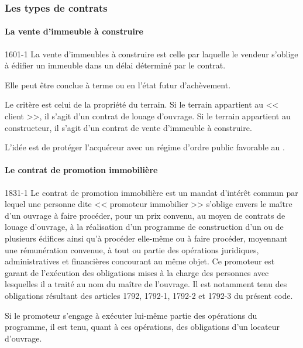 			\subsubsection{Les types de contrats}

				\paragraph{La vente d'immeuble à construire\\}

				\begin{citationArticleCciv}{1601-1}
					La vente d'immeubles à construire est celle par laquelle le vendeur s'oblige à édifier un immeuble dans un délai déterminé par le contrat.

					Elle peut être conclue à terme ou en l'état futur d'achèvement.
				\end{citationArticleCciv}

				Le critère est celui de la propriété du terrain. Si le terrain appartient au << client >>, il s'agit d'un contrat de louage d'ouvrage. Si le terrain appartient au constructeur, il s'agit d'un contrat de vente d'immeuble à construire.

				L'idée est de protéger l'acquéreur avec un régime d'ordre public favorable au \Mo.

				\paragraph{Le contrat de promotion immobilière\\}

				\begin{citationArticleCciv}{1831-1}
					Le contrat de promotion immobilière est un mandat d'intérêt commun par lequel une personne dite << promoteur immobilier >> s'oblige envers le maître d'un ouvrage à faire procéder, pour un prix convenu, au moyen de contrats de louage d'ouvrage, à la réalisation d'un programme de construction d'un ou de plusieurs édifices ainsi qu'à procéder elle-même ou à faire procéder, moyennant une rémunération convenue, à tout ou partie des opérations juridiques, administratives et financières concourant au même objet. Ce promoteur est garant de l'exécution des obligations mises à la charge des personnes avec lesquelles il a traité au nom du maître de l'ouvrage. Il est notamment tenu des obligations résultant des articles 1792, 1792-1, 1792-2 et 1792-3 du présent code.

					Si le promoteur s'engage à exécuter lui-même partie des opérations du programme, il est tenu, quant à ces opérations, des obligations d'un locateur d'ouvrage.
				\end{citationArticleCciv}

